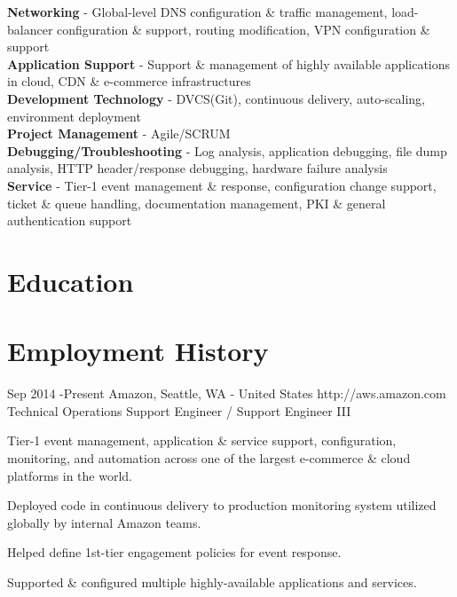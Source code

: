 \documentclass[10pt]{article} %
\begin{document}

{
\textbf{Networking} - Global-level DNS configuration \& traffic management, load-balancer configuration \& support, routing modification, VPN configuration \& support  \\
\textbf{Application Support} - Support \& management of highly available applications in cloud, CDN \& e-commerce infrastructures\\
\textbf{Development Technology} - DVCS(Git), continuous delivery, auto-scaling, environment deployment\\
\textbf{Project Management} - Agile/SCRUM\\
\textbf{Debugging/Troubleshooting} - Log analysis, application debugging, file dump analysis, HTTP header/response debugging, hardware failure analysis \\
\textbf{Service} - Tier-1 event management \& response, configuration change support, ticket \& queue handling, documentation management, PKI \& general authentication support
}


\section{Education}



\section{Employment History}

\job
{Sep 2014 -}{Present}
{Amazon, Seattle, WA - United States}
{http://aws.amazon.com}
{Technical Operations Support Engineer / Support Engineer III}
{
\begin{itemize-noindent}
\item{Tier-1 event management, application \& service support, configuration, monitoring, and automation across one of the largest e-commerce \& cloud platforms in the world.}
\item{Deployed code in continuous delivery to production monitoring system utilized globally by internal Amazon teams.}
\item{Helped define 1st-tier engagement policies for event response.}
\item{Supported \& configured multiple highly-available applications and services.}
\end{itemize-noindent}

}
\end{document}
